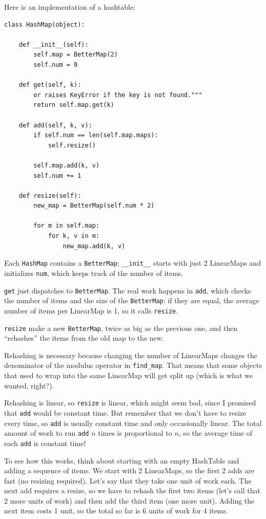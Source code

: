 \documentclass[10pt]{book}
\begin{document}
Here is an implementation of a hashtable:

\begin{verbatim}
class HashMap(object):

    def __init__(self):
        self.map = BetterMap(2)
        self.num = 0

    def get(self, k):
        or raises KeyError if the key is not found."""
        return self.map.get(k)

    def add(self, k, v):
        if self.num == len(self.map.maps):
            self.resize()

        self.map.add(k, v)
        self.num += 1

    def resize(self):
        new_map = BetterMap(self.num * 2)

        for m in self.map:
            for k, v in m:
                new_map.add(k, v)
\end{verbatim}

Each {\tt HashMap} contains a {\tt BetterMap}; \verb"__init__" starts
with just 2 LinearMaps and initializes {\tt num}, which keeps track of
the number of items.

{\tt get} just dispatches to {\tt BetterMap}.  The real work happens
in {\tt add}, which checks the number of items and the size of the
{\tt BetterMap}:
if they are equal, the average number of items per LinearMap
is 1, so it calls {\tt resize}.

{\tt resize} make a new {\tt BetterMap}, twice as big as the previous
one, and then ``rehashes'' the items from the old map to the new.

Rehashing is necessary because changing the number of LinearMaps
changes the denominator of the modulus operator in
\verb"find_map".  That means that some objects that used
to wrap into the same LinearMap will get split up (which is
what we wanted, right?).

Rehashing is linear, so 
{\tt resize} is linear, which might seem bad, since I promised
that {\tt add} would be constant time.  But remember that
we don't have to resize every time, so {\tt add} is usually
constant time and only occasionally linear.  The total amount
of work to run {\tt add} $n$ times is proportional to $n$,
so the average time of each {\tt add} is constant time!

To see how this works, think about starting with an empty
HashTable and adding a sequence of items.  We start with 2 LinearMaps,
so the first 2 adds are fast (no resizing required).  Let's
say that they take one unit of work each.  The next add
requires a resize, so we have to rehash the first two
items (let's call that 2 more units of work) and then
add the third item (one more unit).  Adding the next item
costs 1 unit, so the total so far is
6 units of work for 4 items.
\end{document}
